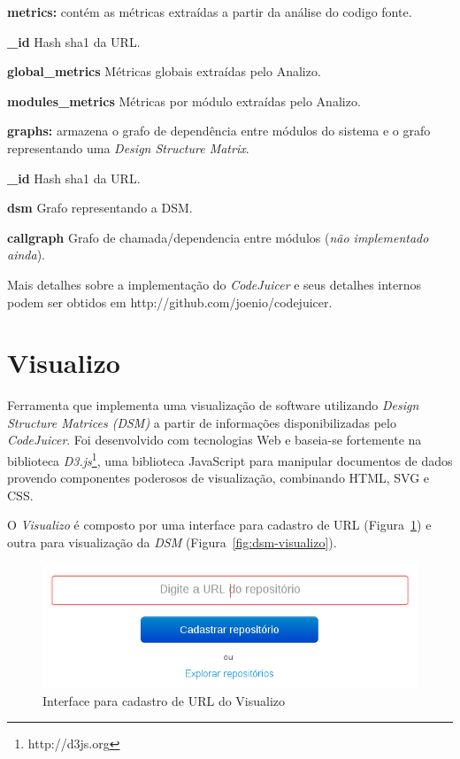 \documentclass[conference]{IEEEtran}
\begin{document}
{\bf metrics:} contém as métricas extraídas a partir da análise do codigo
fonte.

\begin{description}
  \item {{\bf \_id} Hash sha1 da URL.}
  \item {{\bf global\_metrics} Métricas globais extraídas pelo Analizo.}
  \item {{\bf modules\_metrics} Métricas por módulo extraídas pelo Analizo.}
\end{description}

{\bf graphs:} armazena o grafo de dependência entre módulos do sistema e o
grafo representando uma {\it Design Structure Matrix}.

\begin{description}
  \item {{\bf \_id} Hash sha1 da URL.}
  \item {{\bf dsm} Grafo representando a DSM.}
  \item {{\bf callgraph} Grafo de chamada/dependencia entre módulos ({\it não implementado ainda}).}
\end{description}

Mais detalhes sobre a implementação do {\it CodeJuicer} e seus detalhes
internos podem ser obtidos em http://github.com/joenio/codejuicer.

\section{Visualizo}

Ferramenta que implementa uma visualização de software utilizando {\it Design
Structure Matrices (DSM)} a partir de informações disponibilizadas pelo {\it
CodeJuicer}. Foi desenvolvido com tecnologias Web e baseia-se fortemente na
biblioteca {\it D3.js}\footnote{http://d3js.org}, uma biblioteca JavaScript
para manipular documentos de dados provendo componentes poderosos de
visualização, combinando HTML, SVG e CSS.

O {\it Visualizo} é composto por uma interface para cadastro de URL
(Figura~\ref{fig:visualizo-home}) e outra para visualização da {\it DSM}
(Figura~\ref{fig:dsm-visualizo}).

\begin{figure}[h]
\center
\includegraphics[scale=0.3]{visualizo-home.png}
\caption{Interface para cadastro de URL do Visualizo}
\label{fig:visualizo-home}
\end{figure}
\end{document}
